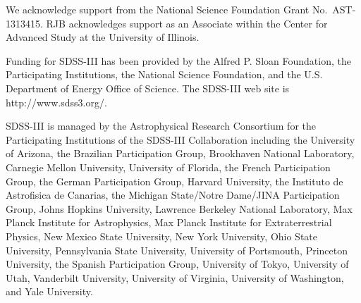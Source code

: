 \documentclass[fleqn,usenatbib]{mnras}
\begin{document}
We acknowledge support from the 
National Science Foundation Grant No.\ AST-1313415.
RJB acknowledges support as an Associate
within the Center for Advanced Study at the University of Illinois.

Funding for SDSS-III has been provided by the Alfred P. Sloan Foundation, the
Participating Institutions, the National Science Foundation, and the U.S.
Department of Energy Office of Science. The SDSS-III web site is
http://www.sdss3.org/.

SDSS-III is managed by the Astrophysical Research Consortium for the
Participating Institutions of the SDSS-III Collaboration including the
University of Arizona, the Brazilian Participation Group, Brookhaven National
Laboratory, Carnegie Mellon University, University of Florida, the French
Participation Group, the German Participation Group, Harvard University, the
Instituto de Astrofisica de Canarias, the Michigan State/Notre Dame/JINA
Participation Group, Johns Hopkins University, Lawrence Berkeley National
Laboratory, Max Planck Institute for Astrophysics, Max Planck Institute for
Extraterrestrial Physics, New Mexico State University, New York University,
Ohio State University, Pennsylvania State University, University of Portsmouth,
Princeton University, the Spanish Participation Group, University of Tokyo,
University of Utah, Vanderbilt University, University of Virginia, University
of Washington, and Yale University.

\footnotesize{


}

\bsp	%
\label{lastpage}
\end{document}
